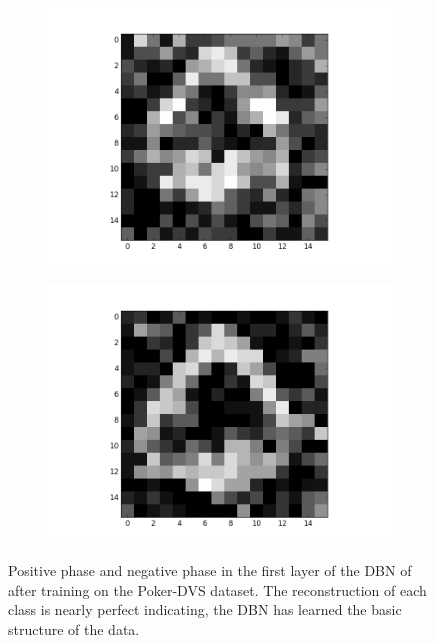 \begin{figure}[h!]
\begin{subfigure}{.25\textwidth}
  		\includegraphics[width=\linewidth]{imgs/poker/recon_img6.png}
  		\label{fig:sub1}
	\end{subfigure}%
	\begin{subfigure}{.25\textwidth}
  		\centering
  		\includegraphics[width=\linewidth]{imgs/poker/recon_img8.png}
  		\label{fig:sub1}
	\end{subfigure}%
	\caption{Positive phase and negative phase in the first layer of the DBN of after training on the Poker-DVS dataset. The reconstruction of each class is nearly perfect indicating, the DBN has learned the basic structure of the data.}
	\label{fig:stripes}
\end{figure}




